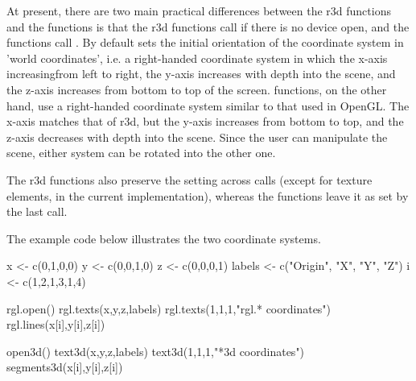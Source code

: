 \begin{Details}
At present, there are two main practical differences between the r3d functions
and the  functions is that the r3d functions call
 if there is no device open, and the
 functions call . By default
 sets the initial orientation of the coordinate
system in 'world coordinates', i.e. a right-handed coordinate system
in which the x-axis increasingfrom left to right, the y-axis
increases with depth into the scene, and the z-axis increases from
bottom to top of the screen.   functions, on the other
hand, use a right-handed coordinate system similar to that used in
OpenGL.  The x-axis matches that of r3d, but the y-axis increases
from bottom to top, and the z-axis decreases with depth into the
scene.  Since the user can manipulate the scene, either system can
be rotated into the other one.  

The r3d functions also preserve the  setting across
calls (except for texture elements, in the current implementation), whereas
the  functions leave it as set by the last call.

The example code below illustrates the two coordinate systems.
\end{Details}
\begin{SeeAlso}\relax
{}
\end{SeeAlso}
\begin{Examples}
\begin{ExampleCode}
    
     x <- c(0,1,0,0)
     y <- c(0,0,1,0)
     z <- c(0,0,0,1)
     labels <- c("Origin", "X", "Y", "Z")
     i <- c(1,2,1,3,1,4)

     rgl.open()
     rgl.texts(x,y,z,labels)
     rgl.texts(1,1,1,"rgl.* coordinates")
     rgl.lines(x[i],y[i],z[i])

     open3d()
     text3d(x,y,z,labels)
     text3d(1,1,1,"*3d coordinates")
     segments3d(x[i],y[i],z[i])
\end{ExampleCode}
\end{Examples}


